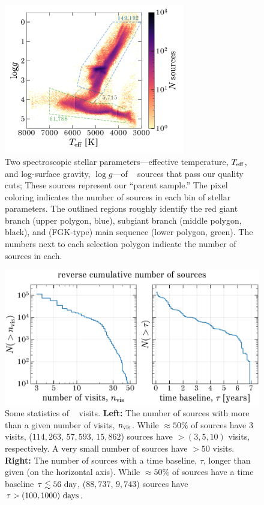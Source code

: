 \documentclass[modern]{aastex62}
\begin{document}
\begin{figure}[!t]
\begin{center}
\includegraphics[width=0.7\textwidth]{specHR.pdf}
\end{center}
\caption{%
Two spectroscopic stellar parameters---effective temperature, $T_{\rm eff}$, and
log-surface gravity, $\log g$---of \apogee\  sources that pass our
quality cuts; These sources represent our ``parent sample.''
The pixel coloring indicates the number of sources in each bin of stellar
parameters.
The outlined regions roughly identify the red giant branch (upper polygon,
blue), subgiant branch (middle polygon, black), and (FGK-type) main sequence
(lower polygon, green).
The numbers next to each selection polygon indicate the number of sources in
each.
\label{fig:specHR}
}
\end{figure}

\begin{figure}[!t]
\begin{center}
\includegraphics[width=1\textwidth]{visitstats.pdf}
\end{center}
\caption{%
Some statistics of \apogee\  visits.
\textbf{Left:} The number of sources with more than a given number of visits,
$n_{\rm vis}$.
While $\approx$$50\%$ of sources have 3 visits, ($114,263$, $57,593$, $15,862$)
sources have $> (3, 5, 10)$ visits, respectively.
A very small number of sources have $>50$ visits.
\textbf{Right:} The number of sources with a time baseline, $\tau$, longer than
given (on the horizontal axis).
While $\approx$$50\%$ of sources have a time baseline $\tau \lesssim 56~{\rm
day}$, ($88,737$, $9,743$) sources have $\tau > (100, 1000)~{\rm days}$.
\label{fig:visitstats}
}
\end{figure}
\end{document}
